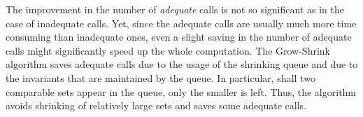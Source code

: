 The improvement in the number of \emph{adequate} calls is not so significant as in the case of inadequate calls. Yet, since the adequate calls are usually much more time consuming than inadequate ones, even a slight saving in the number of adequate calls might significantly speed up the whole computation. The Grow-Shrink algorithm saves adequate calls due to the usage of the shrinking queue and due to the invariants that are maintained by the queue. In particular, shall two comparable sets appear in the queue, only the smaller is left. Thus, the algorithm avoids shrinking of relatively large sets and saves some adequate calls.
